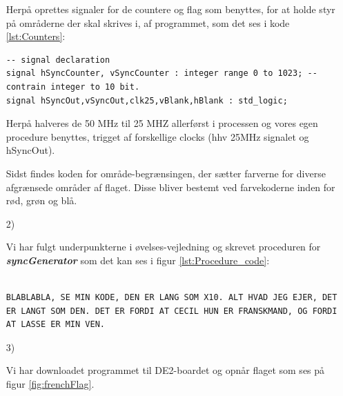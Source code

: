 \begin{enumerate}[1)]
\begin{lstlisting}[caption={Template Boundaries},label={lst:Template_Boundaries}]
	\end{lstlisting}
	
Herpå oprettes signaler for de countere og flag som benyttes, for at holde styr på områderne der skal skrives i, af programmet, som det ses i kode \ref{lst:Counters}:
\begin{lstlisting}[caption={Signal declaration},label={lst:Counters}]
-- signal declaration
signal hSyncCounter, vSyncCounter : integer range 0 to 1023; -- contrain integer to 10 bit.
signal hSyncOut,vSyncOut,clk25,vBlank,hBlank : std_logic;
\end{lstlisting}
	
Herpå halveres de 50 MHz til 25 MHZ allerførst i processen og vores egen procedure benyttes, trigget af forskellige clocks (hhv 25MHz signalet og hSyncOut).

Sidst findes koden for område-begrænsingen, der sætter farverne for diverse afgrænsede områder af flaget. Disse bliver bestemt ved farvekoderne inden for rød, grøn og blå.

\newpage
\item[2)]

Vi har fulgt underpunkterne i øvelses-vejledning og skrevet proceduren for \textit{\textbf{syncGenerator}} som det kan ses i figur \ref{lst:Procedure_code}:
\begin{lstlisting}[caption={syncGenerator Procedure Code},label={lst:Procedure_code}]

BLABLABLA, SE MIN KODE, DEN ER LANG SOM X10. ALT HVAD JEG EJER, DET ER LANGT SOM DEN. DET ER FORDI AT CECIL HUN ER FRANSKMAND, OG FORDI AT LASSE ER MIN VEN.

	\end{lstlisting}

\item[3)] 

Vi har downloadet programmet til DE2-boardet og opnår flaget som ses på figur \ref{fig:frenchFlag}.
\end{enumerate}